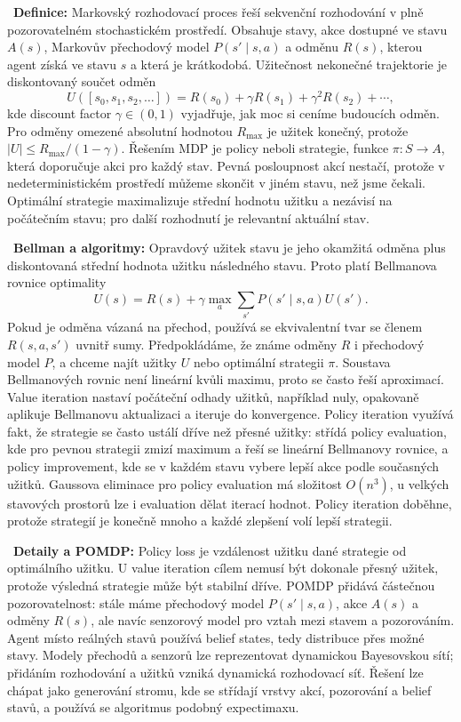\begin{odpoved}
\setlength{\parskip}{2pt}
\noindent{}\ \textbf{Definice:} Markovský rozhodovací proces řeší sekvenční rozhodování v plně pozorovatelném stochastickém prostředí. Obsahuje stavy, akce dostupné ve stavu $A(s)$, Markovův přechodový model $P(s'\mid s,a)$ a odměnu $R(s)$, kterou agent získá ve stavu $s$ a která je krátkodobá. Užitečnost nekonečné trajektorie je diskontovaný součet odměn
\[
U([s_0,s_1,s_2,\dots])=R(s_0)+\gamma R(s_1)+\gamma^2R(s_2)+\cdots,
\]
kde discount factor $\gamma\in(0,1)$ vyjadřuje, jak moc si ceníme budoucích odměn. Pro odměny omezené absolutní hodnotou $R_{\max}$ je užitek konečný, protože $|U|\le R_{\max}/(1-\gamma)$. Řešením MDP je policy neboli strategie, funkce $\pi:S\to A$, která doporučuje akci pro každý stav. Pevná posloupnost akcí nestačí, protože v nedeterministickém prostředí můžeme skončit v jiném stavu, než jsme čekali. Optimální strategie maximalizuje střední hodnotu užitku a nezávisí na počátečním stavu; pro další rozhodnutí je relevantní aktuální stav.\par
\noindent{}\ \textbf{Bellman a algoritmy:} Opravdový užitek stavu je jeho okamžitá odměna plus diskontovaná střední hodnota užitku následného stavu. Proto platí Bellmanova rovnice optimality
\[
U(s)=R(s)+\gamma\max_a\sum_{s'}P(s'\mid s,a)U(s').
\]
Pokud je odměna vázaná na přechod, používá se ekvivalentní tvar se členem $R(s,a,s')$ uvnitř sumy. Předpokládáme, že známe odměny $R$ i přechodový model $P$, a chceme najít užitky $U$ nebo optimální strategii $\pi$. Soustava Bellmanových rovnic není lineární kvůli maximu, proto se často řeší aproximací. Value iteration nastaví počáteční odhady užitků, například nuly, opakovaně aplikuje Bellmanovu aktualizaci a iteruje do konvergence. Policy iteration využívá fakt, že strategie se často ustálí dříve než přesné užitky: střídá policy evaluation, kde pro pevnou strategii zmizí maximum a řeší se lineární Bellmanovy rovnice, a policy improvement, kde se v každém stavu vybere lepší akce podle současných užitků. Gaussova eliminace pro policy evaluation má složitost $O(n^3)$, u velkých stavových prostorů lze i evaluation dělat iterací hodnot. Policy iteration doběhne, protože strategií je konečně mnoho a každé zlepšení volí lepší strategii.\par
\noindent{}\ \textbf{Detaily a POMDP:} Policy loss je vzdálenost užitku dané strategie od optimálního užitku. U value iteration cílem nemusí být dokonale přesný užitek, protože výsledná strategie může být stabilní dříve. POMDP přidává částečnou pozorovatelnost: stále máme přechodový model $P(s'\mid s,a)$, akce $A(s)$ a odměny $R(s)$, ale navíc senzorový model pro vztah mezi stavem a pozorováním. Agent místo reálných stavů používá belief states, tedy distribuce přes možné stavy. Modely přechodů a senzorů lze reprezentovat dynamickou Bayesovskou sítí; přidáním rozhodování a užitků vzniká dynamická rozhodovací síť. Řešení lze chápat jako generování stromu, kde se střídají vrstvy akcí, pozorování a belief stavů, a používá se algoritmus podobný expectimaxu.
\end{odpoved}

